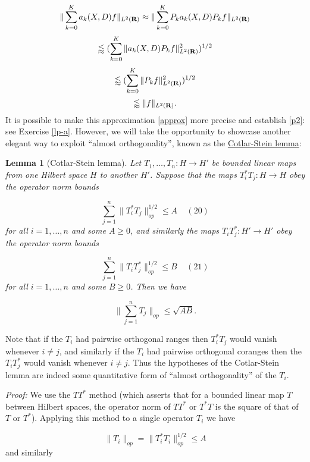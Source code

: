 \documentclass[11pt]{article}
\newtheorem{lemma}[theorem]{Lemma}
\theoremstyle{definition}
\theoremstyle{remark}
\begin{document}
\[\displaystyle  \| \sum_{k=0}^K a_k(X,D) f \|_{L^2({\bf R})} \approx \| \sum_{k=0}^K P_k a_k(X,D) P_k f \|_{L^2({\bf R})} \]
\[\displaystyle  \lessapprox (\sum_{k=0}^K \| a_k(X,D) P_k f \|_{L^2({\bf R})}^2)^{1/2}\]
\[\displaystyle  \lessapprox (\sum_{k=0}^K \| P_k f \|_{L^2({\bf R})}^2)^{1/2}\]
\[\displaystyle  \lessapprox \|f\|_{L^2({\bf R})}.\]
 It is possible to make this approximation \eqref{approx} more precise and establish \eqref{p2}: see Exercise \ref{lp-a}. However, we will take the opportunity to showcase another elegant way to exploit “almost orthogonality”, known as the \href{https://en.wikipedia.org/wiki/Cotlar%E2%80%93Stein_lemma}{Cotlar-Stein lemma}:

\begin{lemma}[Cotlar-Stein lemma]
  Let \({T_1,\dots,T_n: H \rightarrow H'}\) be bounded linear maps from one Hilbert space \({H}\) to another \({H'}\). Suppose that the maps \({T_i^* T_j: H \rightarrow H}\) obey the operator norm bounds \label{hi}

\[\displaystyle  \sum_{j=1}^n \|T_i^* T_j\|_{op}^{1/2} \leq A \ \ \ \ \ (20)\]
 for all \({i=1,\dots,n}\) and some \({A \geq 0}\), and similarly the maps \({T_i T_j^*: H' \rightarrow H'}\) obey the operator norm bounds \label{lo}

\[\displaystyle  \sum_{j=1}^n \|T_i T_j^*\|_{op}^{1/2} \leq B \ \ \ \ \ (21)\]
 for all \({i=1,\dots,n}\) and some \({B \geq 0}\). Then we have 

\[\displaystyle  \| \sum_{j=1}^n T_j \|_{op} \leq \sqrt{AB}.\]

\end{lemma}

Note that if the \({T_i}\) had pairwise orthogonal ranges then \({T_i^* T_j}\) would vanish whenever \({i \neq j}\), and similarly if the \({T_i}\) had pairwise orthogonal coranges then the \({T_i T_j^*}\) would vanish whenever \({i \neq j}\). Thus the hypotheses of the Cotlar-Stein lemma are indeed some quantitative form of “almost orthogonality” of the \({T_i}\).



\emph{Proof:}  We use the \({TT^*}\) method (which asserts that for a bounded linear map \({T}\) between Hilbert spaces, the operator norm of \({TT^*}\) or \({T^* T}\) is the square of that of \({T}\) or \({T^*}\)). Applying this method to a single operator \({T_i}\) we have 

\[\displaystyle  \|T_i\|_{op} = \| T_i^* T_i \|_{op}^{1/2} \leq A \]
 and similarly \label{opa}
\end{document}
